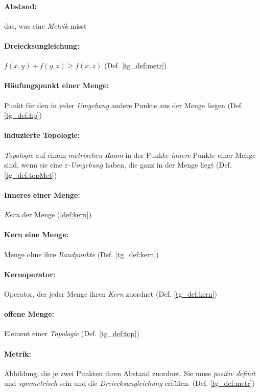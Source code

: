     \paragraph{Abstand:} das, was eine \textit{Metrik} misst
    
    \paragraph{Dreiecksungleichung:} $f(x,y) + f(y,z) \geq f(x,z)$ (Def. \ref{tg_def:metr})

    \paragraph{Häufungspunkt einer Menge:} Punkt für den in jeder \textit{Umgebung} andere Punkte aus der Menge liegen (Def. \ref{tg_def:hp})
    
    \paragraph{induzierte Topologie:} \textit{Topologie} auf einem \textit{metrischen Raum} in der Punkte \textit{innere} Punkte einer Menge sind, wenn sie eine \textit{$\varepsilon$-Umgebung} haben, die ganz in der Menge liegt (Def. \ref{tg_def:topMet})

    \paragraph{Inneres einer Menge:} \textit{Kern} der Menge (\ref{def:kern})

    \paragraph{Kern eine Menge:} Menge ohne ihre \textit{Randpunkte} (Def. \ref{tg_def:kern})

    \paragraph{Kernoperator:} Operator, der jeder Menge ihren \textit{Kern} zuordnet (Def. \ref{tg_def:kern})

    \paragraph{offene Menge:} Element einer \textit{Topologie} (Def. \ref{tg_def:top})
    
    \paragraph{Metrik:} Abbildung, die je zwei Punkten ihren Abstand zuordnet. Sie muss \textit{positiv definit} und \textit{symmetrisch} sein und die \textit{Dreiecksungleichung} erfüllen. (Def. \ref{tg_def:metr})
    
